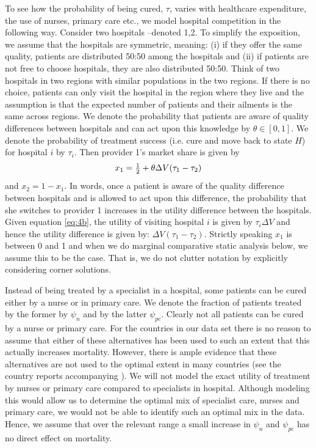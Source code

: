 \documentclass[12pt,english,a4paper]{article}
\begin{document}
To see how the probability of being cured, \(\tau\), varies with healthcare expenditure, the use of nurses, primary care etc., we model hospital competition in the following way. Consider two hospitals --denoted 1,2. To simplify the exposition, we assume that the hospitals are symmetric, meaning: (i) if they offer the same quality, patients are distributed 50:50 among the hospitals and (ii) if patients are not free to choose hospitals, they are also distributed 50:50. Think of two hospitals in two regions with similar populations in the two regions. If there is no choice, patients can only visit the hospital in the region where they live and the assumption is that the expected number of patients and their ailments is the same across regions. We denote the probability that patients are aware of quality differences between hospitals and can act upon this knowledge by \(\theta \in [0,1]\). We denote the probability of treatment success (i.e. cure and move back to state \(H\)) for hospital \(i\)  by \(\tau_i\). Then provider 1's market share is given by
\begin{equation}
\label{eq:8}
x_1 = \textstyle{1\over 2}  + \theta \Delta V (\tau_1 - \tau_2)
\end{equation}
and \(x_2 = 1- x_1\). In words, once a patient is aware of the quality difference between hospitals and is allowed to act upon this difference, the probability that she switches to provider 1 increases in the utility difference between the hospitals. Given equation \eqref{eq:4b}, the utility of visiting hospital \(i\) is given by \(\tau_i \Delta V\) and hence the utility difference is given by: \(\Delta V (\tau_1-\tau_2)\). Strictly speaking \(x_1\) is between 0 and 1 and when we do marginal comparative static analysis below, we assume this to be the case. That is, we do not clutter notation by explicitly considering corner solutions.

Instead of being treated by a specialist in a hospital, some patients can be cured either by a nurse or in primary care. We denote the fraction of patients treated by the former by \(\psi_n\) and by the latter \(\psi_{pc}\). Clearly not all patients can be cured by a nurse or primary care. For the countries in our data set there is no reason to assume that either of these alternatives has been used to such an extent that this actually increases mortality. However, there is ample evidence that these alternatives are not used to the optimal extent in many countries (see the country reports accompanying \cite{countryprofileReport}). We will not model the exact utility of treatment by nurses or primary care compared to specialists in hospital. Although modeling this would allow us to determine the optimal mix of specialist care, nurses and primary care, we would not be able to identify such an optimal mix in the data. Hence, we assume that over the relevant range a small increase in \(\psi_n\) and \(\psi_{pc}\) has no direct effect on mortality.
\end{document}
